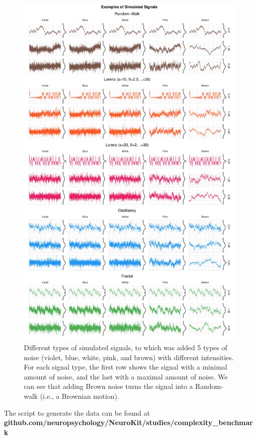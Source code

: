 \documentclass[
  man]{apa6}
\begin{document}
\begin{figure}
\centering
\includegraphics{manuscript_files/figure-latex/signals-1.pdf}
\caption{\label{fig:signals}Different types of simulated signals, to which was added 5 types of noise (violet, blue, white, pink, and brown) with different intensities. For each signal type, the first row shows the signal with a minimal amount of noise, and the last with a maximal amount of noise. We can see that adding Brown noise turns the signal into a Random-walk (i.e., a Brownian motion).}
\end{figure}

The script to generate the data can be found at \textbf{github.com/neuropsychology/NeuroKit/studies/complexity\_benchmark}
\end{document}
